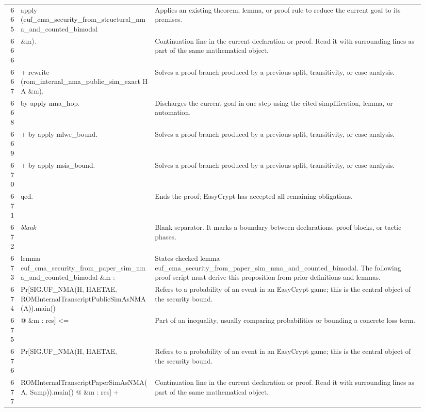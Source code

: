 \documentclass[10pt]{article}
\begin{document}
\begin{longtable}{r L{0.53\textwidth} L{0.37\textwidth}}
665 & {\ttfamily\scriptsize apply (euf\_cma\_security\_from\_structural\_nma\_and\_counted\_bimodal} & Applies an existing theorem, lemma, or proof rule to reduce the current goal to its premises. \\
666 & {\ttfamily\scriptsize          \&m).} & Continuation line in the current declaration or proof.  Read it with surrounding lines as part of the same mathematical object. \\
667 & {\ttfamily\scriptsize + rewrite (rom\_internal\_nma\_public\_sim\_exact H A \&m).} & Solves a proof branch produced by a previous split, transitivity, or case analysis. \\
668 & {\ttfamily\scriptsize   by apply nma\_hop.} & Discharges the current goal in one step using the cited simplification, lemma, or automation. \\
669 & {\ttfamily\scriptsize + by apply mlwe\_bound.} & Solves a proof branch produced by a previous split, transitivity, or case analysis. \\
670 & {\ttfamily\scriptsize + by apply msis\_bound.} & Solves a proof branch produced by a previous split, transitivity, or case analysis. \\
671 & {\ttfamily\scriptsize qed.} & Ends the proof; EasyCrypt has accepted all remaining obligations. \\
672 & {\ttfamily\scriptsize \emph{blank}} & Blank separator.  It marks a boundary between declarations, proof blocks, or tactic phases. \\
673 & {\ttfamily\scriptsize lemma euf\_cma\_security\_from\_paper\_sim\_nma\_and\_counted\_bimodal \&m :} & States checked lemma euf\_cma\_security\_from\_paper\_sim\_nma\_and\_counted\_bimodal.  The following proof script must derive this proposition from prior definitions and lemmas. \\
674 & {\ttfamily\scriptsize   Pr[SIG.UF\_NMA(H, HAETAE, ROMInternalTranscriptPublicSimAsNMA(A)).main()} & Refers to a probability of an event in an EasyCrypt game; this is the central object of the security bound. \\
675 & {\ttfamily\scriptsize        @ \&m : res] <=} & Part of an inequality, usually comparing probabilities or bounding a concrete loss term. \\
676 & {\ttfamily\scriptsize   Pr[SIG.UF\_NMA(H, HAETAE,} & Refers to a probability of an event in an EasyCrypt game; this is the central object of the security bound. \\
677 & {\ttfamily\scriptsize        ROMInternalTranscriptPaperSimAsNMA(A, Samp)).main() @ \&m : res] +} & Continuation line in the current declaration or proof.  Read it with surrounding lines as part of the same mathematical object. \\

\end{longtable}
\end{document}
